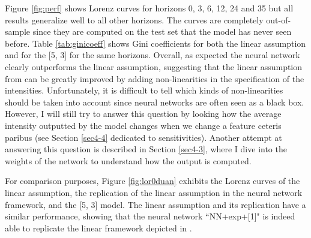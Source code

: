 Figure \ref{fig:perf} shows Lorenz curves for horizons 0, 3, 6, 12, 24 and 35 but all results generalize well to all other horizons. The curves are completely out-of-sample since they are computed on the test set that the model has never seen before. Table \ref{tab:ginicoeff} shows Gini coefficients for both the linear assumption \citet{Duan2012} and for the [5, 3] for the same horizons. Overall, as expected the neural network clearly outperforms the linear assumption, suggesting that the linear assumption from \citet{Duan2012} can be greatly improved by adding non-linearities in the specification of the intensities. Unfortunately, it is difficult to tell which kinds of non-linearities should be taken into account since neural networks are often seen as a black box. However, I will still try to answer this question by looking how the average intensity outputted by the model changes when we change a feature ceteris paribus (see Section \ref{sec4-4} dedicated to sensitivities). Another attempt at answering this question is described in Section \ref{sec4-3}, where I dive into the weights of the network to understand how the output is computed.

For comparison purposes, Figure \ref{fig:lor0duan} exhibits the Lorenz curves of the linear assumption, the replication of the linear assumption in the neural network framework, and the [5, 3] model. The linear assumption and its replication have a similar performance, showing that the neural network ``NN+exp+[1]" is indeed able to replicate the linear framework depicted in \citet{Duan2012}.

